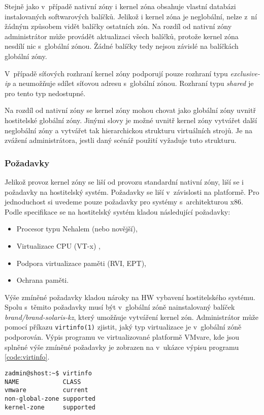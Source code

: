 Stejně jako v~případě nativní zóny i kernel zóna obsahuje vlastní databázi instalovaných softwarových balíčků. Jelikož i 
kernel zóna je neglobální, nelze z~ní žádným způsobem vidět balíčky ostatních zón. Na rozdíl od nativní zóny administrátor
může provádět aktualizaci všech balíčků, protože kernel zóna nesdílí nic s~globální zónou. Žádné balíčky tedy nejsou závislé
na balíčkách globální zóny.

V~případě síťových rozhraní kernel zóny podporují pouze rozhraní typu \textit{exclusive-ip} a neumožňuje sdílet síťovou adresu
s~globální zónou. Rozhraní typu \textit{shared} je pro tento typ nedostupné.

Na rozdíl od nativní zóny se kernel zóny mohou chovat jako globální zóny uvnitř hostitelské globální zóny. Jinými slovy je
možné uvnitř kernel zóny vytvářet další neglobální zóny a vytvářet tak hierarchickou strukturu virtuálních strojů. Je na zvážení
administrátora, jestli daný scénář použití vyžaduje tuto strukturu.
\subsubsection*{Požadavky}
\label{chapter:zones:types:kernel:demands}
Jelikož provoz kernel zóny se liší od provozu standardní nativní zóny, liší se i požadavky na hostitelský systém. Požadavky
se liší v~závislosti na platformě. Pro jednoduchost si uvedeme pouze požadavky pro systémy s~architekturou x86. Podle specifikace
\cite{oracle:solaris:zones:kernel_zones_requiremets} se na hostitelský systém kladou následující požadavky:
\begin{itemize}
 \item Procesor typu Nehalem (nebo novější),
 \item Virtualizace CPU (VT-x) ,
 \item Podpora virtualizace paměti (RVI, EPT),
 \item Ochrana paměti.
\end{itemize}
Výše zmíněné požadavky kladou nároky na HW vybavení hostitelského systému. Spolu s~těmito požadavky musí být v~globální zóně
nainstalovaný balíček \textit{brand/brand-solaris-kz}, který umožňuje vytváření kernel zón. Administrátor může pomocí příkazu
\verb|virtinfo(1)| zjistit, jaký typ virtualizace je v~globální zóně podporován. Výpis programu ve virtualizované platformě
VMvare, kde jsou splněné výše zmíněné požadavky je zobrazen na v~ukázce výpisu programu \ref{code:virtinfo}.
\begin{lstlisting}[caption={Výpis příkazu virtinfo}, label={code:virtinfo}]  
zadmin@shost:~$ virtinfo
NAME            CLASS     
vmware          current   
non-global-zone supported
kernel-zone     supported
\end{lstlisting}
